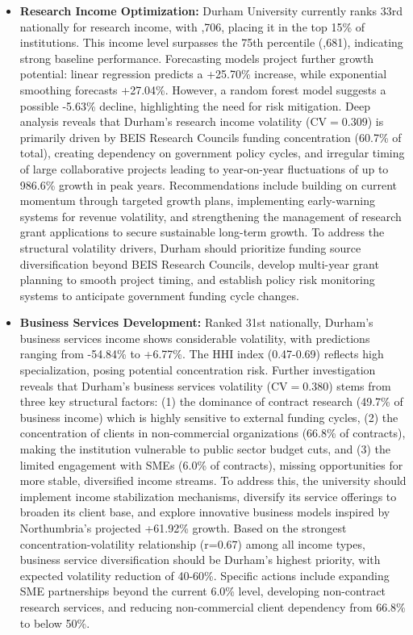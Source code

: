 \documentclass[journal,onecolumn, 10pt,draftclsnofoot]{IEEEtran}
\begin{document}
\begin{itemize}
    \item \textbf{Research Income Optimization:} Durham University currently ranks 33rd nationally for research income, with ,706, placing it in the top 15\% of institutions. This income level surpasses the 75th percentile (,681), indicating strong baseline performance. Forecasting models project further growth potential: linear regression predicts a +25.70\% increase, while exponential smoothing forecasts +27.04\%. However, a random forest model suggests a possible -5.63\% decline, highlighting the need for risk mitigation. Deep analysis reveals that Durham's research income volatility ($\mathrm{CV}=0.309$) is primarily driven by BEIS Research Councils funding concentration (60.7\% of total), creating dependency on government policy cycles, and irregular timing of large collaborative projects leading to year-on-year fluctuations of up to 986.6\% growth in peak years. Recommendations include building on current momentum through targeted growth plans, implementing early-warning systems for revenue volatility, and strengthening the management of research grant applications to secure sustainable long-term growth. To address the structural volatility drivers, Durham should prioritize funding source diversification beyond BEIS Research Councils, develop multi-year grant planning to smooth project timing, and establish policy risk monitoring systems to anticipate government funding cycle changes.
      
    \item \textbf{Business Services Development:} Ranked 31st nationally, Durham's business services income shows considerable volatility, with predictions ranging from -54.84\% to +6.77\%. The HHI index (0.47-0.69) reflects high specialization, posing potential concentration risk. Further investigation reveals that Durham's business services volatility ($\mathrm{CV}=0.380$) stems from three key structural factors: (1) the dominance of contract research (49.7\% of business income) which is highly sensitive to external funding cycles, (2) the concentration of clients in non-commercial organizations (66.8\% of contracts), making the institution vulnerable to public sector budget cuts, and (3) the limited engagement with SMEs (6.0\% of contracts), missing opportunities for more stable, diversified income streams. To address this, the university should implement income stabilization mechanisms, diversify its service offerings to broaden its client base, and explore innovative business models inspired by Northumbria's projected +61.92\% growth. Based on the strongest concentration-volatility relationship (r=0.67) among all income types, business service diversification should be Durham's highest priority, with expected volatility reduction of 40-60\%. Specific actions include expanding SME partnerships beyond the current 6.0\% level, developing non-contract research services, and reducing non-commercial client dependency from 66.8\% to below 50\%.
    

\end{itemize}
\end{document}
